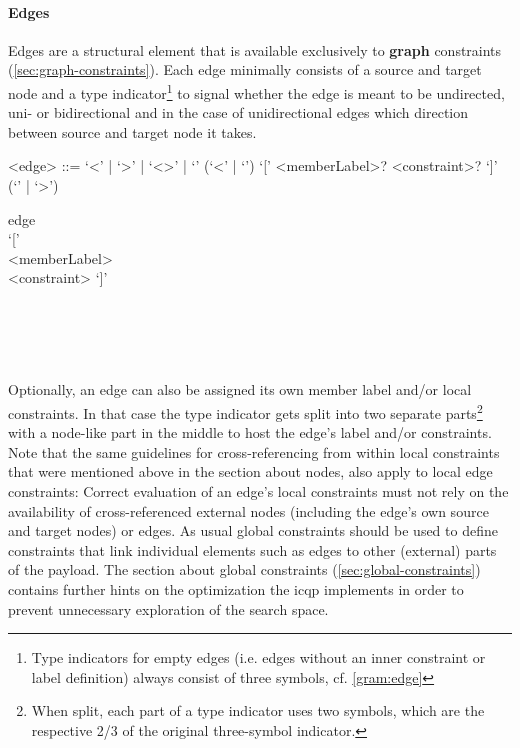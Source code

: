 \documentclass[11pt,a4paper]{article}
\begin{document}
\paragraph{Edges}
\noindent Edges are a structural element that is available exclusively to \textbf{graph} constraints (\ref{sec:graph-constraints}).
Each edge minimally consists of a source and target node and a type indicator\footnote{Type indicators for empty edges (i.e. edges without an inner constraint or label definition) always consist of three symbols, cf. \cref{gram:edge}} to signal whether the edge is meant to be undirected, uni- or bidirectional and in the case of unidirectional edges which direction between source and target node it takes.

\begin{gram}
	\label{gram:edge}
	\begin{grammar}	
		<edge> ::= `\textless\textminus\textminus' | `\textminus\textminus\textgreater' | `\textless\textminus\textgreater' | `\textminus\textminus\textminus'
		\alt (`\textless\textminus' | `\textminus\textminus') `[' <memberLabel>? <constraint>? `]' (`\textminus\textminus' | `\textminus\textgreater')
	\end{grammar}
	\diagsep
	\begin{rrdiag*}{edge}
		\sst 
		\sst \lit{\textless\textminus} \\ \lit{\textminus\textminus} \est `[' 
		\sst \\ <memberLabel> \est
		\sst \\ <constraint> \est `]' 
		\sst \lit{\textminus\textminus} \\ \lit{\textminus\textgreater} \est \\
		\lit{\textless\textminus\textminus} \\
		\lit{\textminus\textminus\textgreater} \\ 
		\lit{\textless\textminus\textgreater} \\
		\lit{\textminus\textminus\textminus}
		\est
	\end{rrdiag*}
\end{gram}

Optionally, an edge can also be assigned its own member label and/or local constraints.
In that case the type indicator gets split into two separate parts\footnote{When split, each part of a type indicator uses two symbols, which are the respective 2/3 of the original three-symbol indicator.} with a node-like part in the middle to host the edge's label and/or constraints.
Note that the same guidelines for cross-referencing from within local constraints that were mentioned above in the section about nodes, also apply to local edge constraints: 
Correct evaluation of an edge's local constraints must not rely on the availability of cross-referenced external nodes (including the edge's own source and target nodes) or edges.
As usual global constraints should be used to define constraints that link individual elements such as edges to other (external) parts of the payload.
The section about global constraints (\ref{sec:global-constraints}) contains further hints on the optimization the \ac{icqp} implements in order to prevent unnecessary exploration of the search space.
\end{document}
